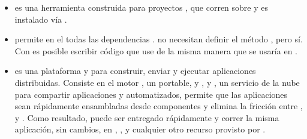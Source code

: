 	\begin{itemize}
		\item
			\textbf{\grunttoolNAME} es una herramienta \commandLine \taskBased construida para proyectos \javaScriptNAME, que corren sobre \nodejsNAME y es instalado vía \npm \cite{technology_gruntjs}.

		\item
			\textbf{\browserifyNAME} permite \requireINT \modulesAS en el \browsersINT \bundlingUpCPT todas las dependencias \cite{online_official_website_browserify}. \browsersINT no necesitan definir el método \requestINT, pero \nodejsNAME sí. Con \browserifyNAME es posible escribir código que use \requireINT de la misma manera que se usaría en \nodejsNAME \cite{online_official_website_browserify}.

		\item
			\textbf{\dockerNAME} es una plataforma \openSourcePC y \sysadmins para construir, enviar y ejecutar aplicaciones distribuidas. Consiste en el motor \dockerNAME, un portable, \lightweightPL \runtimeCPT y \packagingCPT \tool, y \dockerNAME \hub, un servicio de la nube para compartir aplicaciones y \workflowsCPT automatizados, \dockerNAME permite que las aplicaciones sean rápidamente ensambladas desde componentes y elimina la fricción entre \developmentPC, \qaSIGLA y \productionPC \environmentsPL. Como resultado, puede ser entregado rápidamente y correr la misma aplicación, sin cambios, en \laptops, \dataPC \centerCustom \vmsSIGLA, y cualquier otro recurso provisto por \internetINT \cite{technology_docker}.


\end{itemize}
